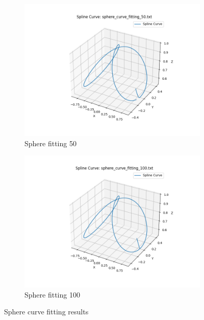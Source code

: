 \documentclass[a4paper]{article}
\begin{document}
\begin{figure}[htbp]
  \vspace{0.5cm}

  \begin{subfigure}[t]{0.45\textwidth}
      \centering
      \includegraphics[width=\textwidth]{figures/sphere/sphere_curve_fitting_50.png}
      \caption*{Sphere fitting 50}
  \end{subfigure}
  \hfill
  \begin{subfigure}[t]{0.45\textwidth}
      \centering
      \includegraphics[width=\textwidth]{figures/sphere/sphere_curve_fitting_100.png}
      \caption*{Sphere fitting 100}
  \end{subfigure}
  \caption{Sphere curve fitting results}
  \label{fig:sphere_fitting}
\end{figure}
\end{document}
